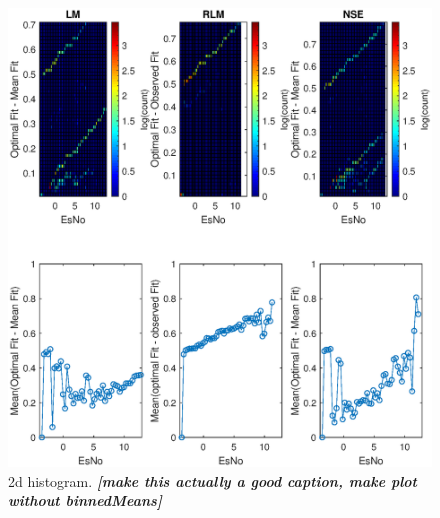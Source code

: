 \begin{figure}
\centering
\includegraphics[scale=0.9]{figures/c_sim_results/sim22_2dhist.eps}
\caption{2d histogram. \textit{\textbf{[make this actually a good caption, make plot without binnedMeans]}}}
\label{fig:cSimBin2dHist}
\end{figure}

